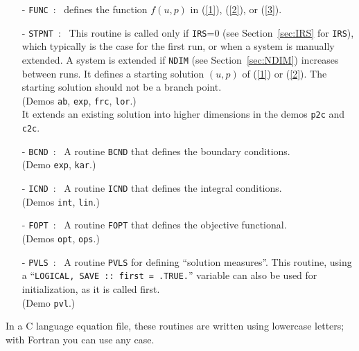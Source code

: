 \documentclass[12pt]{report}
\begin{document}
\begin{itemize}
\item[-] {\tt FUNC}~:~
  defines the function $f(u,p)$ in (\ref{1}), (\ref{2}), or (\ref{3}).
\item[-] {\tt STPNT}~:~
  This routine is called only if {\tt IRS}=0 
(see Section~\ref{sec:IRS} for {\tt IRS}),
  which typically is the case for the first run, or when a system
  is manually extended. A system is extended if {\tt NDIM} (see
  Section~\ref{sec:NDIM}) increases between runs.
  It defines a starting solution $(u,p)$ of (\ref{1}) or (\ref{2}).
  The starting solution should not be a branch point.\\
  (Demos {\tt ab}, {\tt exp}, {\tt frc}, {\tt lor}.)\\
  It extends an existing solution into higher dimensions in the demos
  {\tt p2c} and {\tt c2c}.
\item[-] {\tt BCND}~:~ 
  A routine {\tt BCND} that defines the boundary conditions. \\
  (Demo {\tt exp}, {\tt kar}.)
\item[-] {\tt ICND}~:~ 
  A routine {\tt ICND} that defines the integral conditions. \\ 
  (Demos {\tt int}, {\tt lin}.)  
\item[-] {\tt FOPT}~:~ 
  A routine {\tt FOPT} that defines the objective functional. \\ 
  (Demos {\tt opt}, {\tt ops}.)  
\item[-] {\tt PVLS}~:~
  A routine {\tt PVLS} for defining ``solution measures''.
  This routine, using a ``\texttt{LOGICAL, SAVE :: first = .TRUE.}''
  variable can also be used for initialization, as it is called
  first. \\
  (Demo {\tt pvl}.)
\end{itemize}

In a C language equation file, these routines are written using
lowercase letters; with Fortran you can use any case.
 
\end{document}
